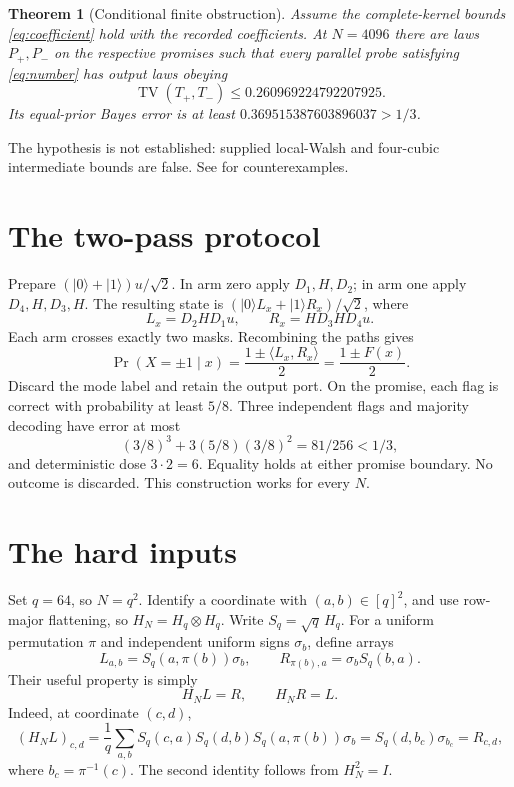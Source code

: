 \documentclass[11pt]{article}
\newtheorem{theorem}{Theorem}
\newcommand{\TV}{\operatorname{TV}}
\begin{document}
\begin{theorem}[Conditional finite obstruction]\label{thm:finite}
Assume the complete-kernel bounds \eqref{eq:coefficient} hold with the
recorded coefficients. At $N=4096$ there are laws $P_+,P_-$ on the
respective promises such that every parallel probe satisfying
\eqref{eq:number} has output laws obeying
\begin{equation}
 \TV(T_+,T_-)\le0.260969224792207925.
 \label{eq:total}
\end{equation}
Its equal-prior Bayes error is at least
$0.369515387603896037>1/3$.
\end{theorem}

The hypothesis is not established: supplied local-Walsh and four-cubic
intermediate bounds are false. See  for counterexamples.

\section{The two-pass protocol}
Prepare $(|0\rangle+|1\rangle)u/\sqrt2$.
In arm zero apply $D_1,H,D_2$; in arm one apply $D_4,H,D_3,H$.
The resulting state is $(|0\rangle L_x+|1\rangle R_x)/\sqrt2$, where
\[
 L_x=D_2HD_1u,\qquad R_x=HD_3HD_4u.
\]
Each arm crosses exactly two masks. Recombining the paths gives
\begin{equation}
 \Pr(X=\pm1\mid x)=\frac{1\pm\langle L_x,R_x\rangle}{2}
                 =\frac{1\pm F(x)}2.
 \label{eq:flag}
\end{equation}
Discard the mode label and retain the output port.
On the promise, each flag is correct with probability at least $5/8$.
Three independent flags and majority decoding have error at most
\[
 (3/8)^3+3(5/8)(3/8)^2=81/256<1/3,
\]
and deterministic dose $3\cdot2=6$. Equality holds at either promise
boundary. No outcome is discarded. This construction works for every $N$.

\section{The hard inputs}
Set $q=64$, so $N=q^2$. Identify a coordinate with $(a,b)\in[q]^2$,
and use row-major flattening, so $H_N=H_q\otimes H_q$.
Write $S_q=\sqrt q\,H_q$.
For a uniform permutation $\pi$ and independent uniform signs $\sigma_b$,
define arrays
\begin{equation}
 L_{a,b}=S_q(a,\pi(b))\sigma_b,\qquad
 R_{\pi(b),a}=\sigma_bS_q(b,a).
 \label{eq:lr}
\end{equation}
Their useful property is simply
\begin{equation}
                         H_N L=R,\qquad H_N R=L.
 \label{eq:hlr}
\end{equation}
Indeed, at coordinate $(c,d)$,
\[
 (H_NL)_{c,d}
 =\frac1q\sum_{a,b}S_q(c,a)S_q(d,b)S_q(a,\pi(b))\sigma_b
 =S_q(d,b_c)\sigma_{b_c}=R_{c,d},
\]
where $b_c=\pi^{-1}(c)$. The second identity follows from $H_N^2=I$.
\end{document}
